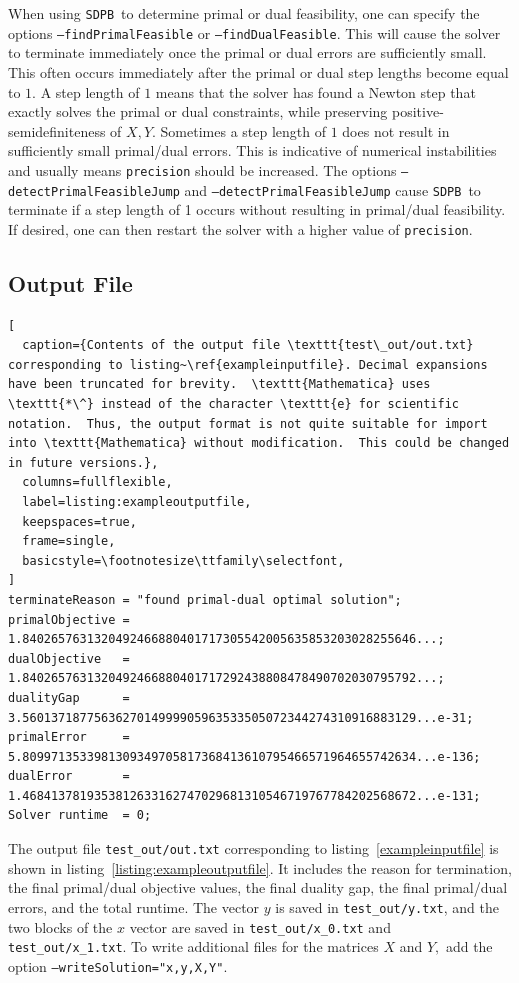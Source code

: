 \documentclass[12pt]{article}
\numberwithin{equation}{section}
\newcommand\SDPB{\texttt{SDPB}}
\begin{document}
When using \SDPB\ to determine primal or dual feasibility, one can specify the options \texttt{--findPrimalFeasible} or \texttt{--findDualFeasible}.  This will cause the solver to terminate immediately once the primal or dual errors are sufficiently small.  This often occurs immediately after the primal or dual step lengths become equal to $1$.  A step length of $1$ means that the solver has found a Newton step that exactly solves the primal or dual constraints, while preserving positive-semidefiniteness of $X,Y$.  Sometimes a step length of $1$ does not result in sufficiently small primal/dual errors.  This is indicative of numerical instabilities and usually means \texttt{precision} should be increased.  The options \texttt{--detectPrimalFeasibleJump} and \texttt{--detectPrimalFeasibleJump} cause \SDPB\ to terminate if a step length of 1 occurs without resulting in primal/dual feasibility.  If desired, one can then restart the solver with a higher value of \texttt{precision}.


\subsection{Output File}

\begin{lstlisting}[
  caption={Contents of the output file \texttt{test\_out/out.txt} corresponding to listing~\ref{exampleinputfile}. Decimal expansions have been truncated for brevity.  \texttt{Mathematica} uses \texttt{*\^} instead of the character \texttt{e} for scientific notation.  Thus, the output format is not quite suitable for import into \texttt{Mathematica} without modification.  This could be changed in future versions.},
  columns=fullflexible,
  label=listing:exampleoutputfile,
  keepspaces=true,
  frame=single,
  basicstyle=\footnotesize\ttfamily\selectfont,
]
terminateReason = "found primal-dual optimal solution";
primalObjective = 1.8402657631320492466880401717305542005635853203028255646...;
dualObjective   = 1.8402657631320492466880401717292438808478490702030795792...;
dualityGap      = 3.5601371877563627014999905963533505072344274310916883129...e-31;
primalError     = 5.8099713533981309349705817368413610795466571964655742634...e-136;
dualError       = 1.4684137819353812633162747029681310546719767784202568672...e-131;
Solver runtime  = 0;
\end{lstlisting}


The output file \texttt{test\_out/out.txt} corresponding to
listing~\ref{exampleinputfile} is shown in
listing~\ref{listing:exampleoutputfile}. It includes the reason for
termination, the final primal/dual objective values, the final duality
gap, the final primal/dual errors, and the total runtime. The vector
$y$ is saved in \texttt{test\_out/y.txt}, and the two blocks of the $x$ vector
are saved in \texttt{test\_out/x\_0.txt} and
\texttt{test\_out/x\_1.txt}.  To write additional files for the matrices $X$ and $Y,$ add the
option \newline
\texttt{--writeSolution="x,y,X,Y"}.
\end{document}
